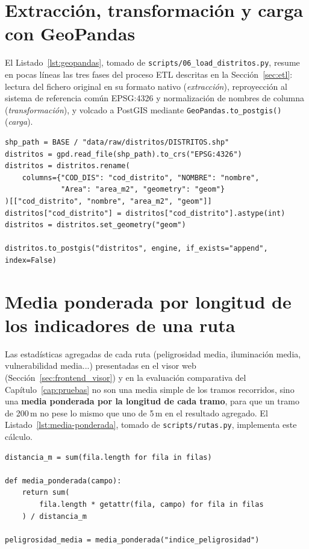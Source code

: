 \section{Extracción, transformación y carga con GeoPandas}
\label{ap:sec:etl_geopandas}

El Listado~\ref{lst:geopandas}, tomado de \texttt{scripts/06\_load\_distritos.py}, resume en pocas líneas las tres fases del proceso ETL descritas en la Sección~\ref{sec:etl}: lectura del fichero original en su formato nativo (\textit{extracción}), reproyección al sistema de referencia común EPSG:4326 y normalización de nombres de columna (\textit{transformación}), y volcado a PostGIS mediante \texttt{GeoPandas.to\_postgis()} (\textit{carga}).

\begin{lstlisting}[style=Python, caption={Extracción, transformación y carga de un Shapefile (\texttt{scripts/06\_load\_distritos.py}).}, label={lst:geopandas}]
shp_path = BASE / "data/raw/distritos/DISTRITOS.shp"
distritos = gpd.read_file(shp_path).to_crs("EPSG:4326")
distritos = distritos.rename(
    columns={"COD_DIS": "cod_distrito", "NOMBRE": "nombre",
             "Area": "area_m2", "geometry": "geom"}
)[["cod_distrito", "nombre", "area_m2", "geom"]]
distritos["cod_distrito"] = distritos["cod_distrito"].astype(int)
distritos = distritos.set_geometry("geom")

distritos.to_postgis("distritos", engine, if_exists="append", index=False)
\end{lstlisting}

\section{Media ponderada por longitud de los indicadores de una ruta}
\label{ap:sec:media_ponderada}

Las estadísticas agregadas de cada ruta (peligrosidad media, iluminación media, vulnerabilidad media...) presentadas en el visor web (Sección~\ref{sec:frontend_visor}) y en la evaluación comparativa del Capítulo~\ref{cap:pruebas} no son una media simple de los tramos recorridos, sino una \textbf{media ponderada por la longitud de cada tramo}, para que un tramo de 200\,m no pese lo mismo que uno de 5\,m en el resultado agregado. El Listado~\ref{lst:media-ponderada}, tomado de \texttt{scripts/rutas.py}, implementa este cálculo.

\begin{lstlisting}[style=Python, caption={Cálculo de la media ponderada por longitud (\texttt{scripts/rutas.py}).}, label={lst:media-ponderada}]
distancia_m = sum(fila.length for fila in filas)

def media_ponderada(campo):
    return sum(
        fila.length * getattr(fila, campo) for fila in filas
    ) / distancia_m

peligrosidad_media = media_ponderada("indice_peligrosidad")
\end{lstlisting}
